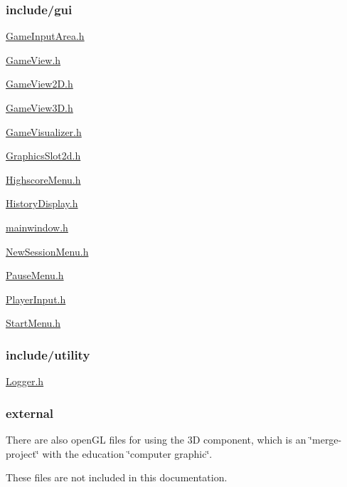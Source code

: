 \subsubsection*{include/gui}


\begin{DoxyItemize}
\item \hyperlink{GameInputArea_8h_source}{Game\-Input\-Area.\-h}
\item \hyperlink{GameView_8h_source}{Game\-View.\-h}
\item \hyperlink{GameView2D_8h_source}{Game\-View2\-D.\-h}
\item \hyperlink{GameView3D_8h_source}{Game\-View3\-D.\-h}
\item \hyperlink{GameVisualizer_8h_source}{Game\-Visualizer.\-h}
\item \hyperlink{GraphicsSlot2d_8h_source}{Graphics\-Slot2d.\-h}
\item \hyperlink{HighscoreMenu_8h_source}{Highscore\-Menu.\-h}
\item \hyperlink{HistoryDisplay_8h_source}{History\-Display.\-h}
\item \hyperlink{mainwindow_8h_source}{mainwindow.\-h}
\item \hyperlink{NewSessionMenu_8h_source}{New\-Session\-Menu.\-h}
\item \hyperlink{PauseMenu_8h_source}{Pause\-Menu.\-h}
\item \hyperlink{PlayerInput_8h_source}{Player\-Input.\-h}
\item \hyperlink{StartMenu_8h_source}{Start\-Menu.\-h}
\end{DoxyItemize}

\subsubsection*{include/utility}


\begin{DoxyItemize}
\item \hyperlink{Logger_8h_source}{Logger.\-h}
\end{DoxyItemize}

\subsubsection*{external}

There are also open\-G\-L files for using the 3\-D component, which is an \char`\"{}merge-\/project\char`\"{} with the education \char`\"{}computer graphic\char`\"{}. \par
 These files are not included in this documentation. 